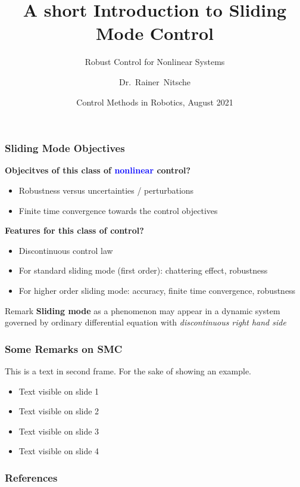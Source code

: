 \documentclass{beamer}
\title[Sliding Mode Control] %
{A short Introduction to Sliding Mode Control}
\subtitle{Robust Control for Nonlinear Systems}
\author[Rainer Nitsche] %
{Dr.~Rainer~Nitsche\inst{1}} %
\institute[Festo SE \& Co. KG] %
{
  \inst{1}%
  Dept. Robotics\\
 System Design Group
}
\date[ \today] %
{Control Methods in Robotics, August 2021}
\begin{document}
\frame{\titlepage}

\begin{frame}
\frametitle{Sliding Mode Objectives}
{\bf Objecitves of this class of \textcolor{blue}{nonlinear} control?}
\begin{itemize}
 \item Robustness versus uncertainties / perturbations
 \item Finite time convergence towards the control objectives
\end{itemize}
\pause %
{\bf Features for this class of control?}
\begin{itemize}
 \item Discontinuous control law
 \item For standard sliding mode (first order): chattering effect, robustness
 \item For higher order sliding mode: accuracy, finite time convergence, robustness
\end{itemize}
\pause %
\begin{block}{Remark} {\bf Sliding mode} as a phenomenon may appear in
  a dynamic system governed by ordinary differential equation with
  {\em discontinuous right hand side}
\end{block}

\end{frame}

\begin{frame}
\frametitle{Some Remarks on SMC}
This is a text in second frame. 
For the sake of showing an example.

\begin{itemize}
 \item<1-> Text visible on slide 1
 \item<2-> Text visible on slide 2
 \item<3> Text visible on slide 3
 \item<4-> Text visible on slide 4
\end{itemize}
\end{frame}





\begin{frame}
\frametitle{References}
\printbibliography
\end{frame}
\end{document}
